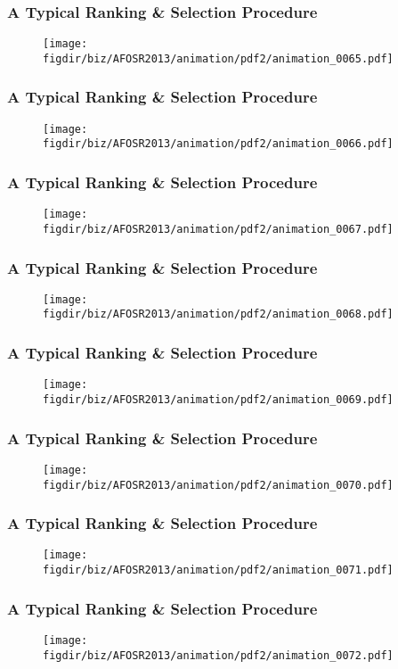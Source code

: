\documentclass[13pt]{beamer}
\newcommand{\figdir}{../../fig}
\begin{document}
\begin{frame}\frametitle{A Typical Ranking \& Selection Procedure}\begin{figure}\texttt{[image: \\figdir/biz/AFOSR2013/animation/pdf2/animation\_0065.pdf]}\end{figure}\end{frame}
\begin{frame}\frametitle{A Typical Ranking \& Selection Procedure}\begin{figure}\texttt{[image: \\figdir/biz/AFOSR2013/animation/pdf2/animation\_0066.pdf]}\end{figure}\end{frame}
\begin{frame}\frametitle{A Typical Ranking \& Selection Procedure}\begin{figure}\texttt{[image: \\figdir/biz/AFOSR2013/animation/pdf2/animation\_0067.pdf]}\end{figure}\end{frame}
\begin{frame}\frametitle{A Typical Ranking \& Selection Procedure}\begin{figure}\texttt{[image: \\figdir/biz/AFOSR2013/animation/pdf2/animation\_0068.pdf]}\end{figure}\end{frame}
\begin{frame}\frametitle{A Typical Ranking \& Selection Procedure}\begin{figure}\texttt{[image: \\figdir/biz/AFOSR2013/animation/pdf2/animation\_0069.pdf]}\end{figure}\end{frame}
\begin{frame}\frametitle{A Typical Ranking \& Selection Procedure}\begin{figure}\texttt{[image: \\figdir/biz/AFOSR2013/animation/pdf2/animation\_0070.pdf]}\end{figure}\end{frame}
\begin{frame}\frametitle{A Typical Ranking \& Selection Procedure}\begin{figure}\texttt{[image: \\figdir/biz/AFOSR2013/animation/pdf2/animation\_0071.pdf]}\end{figure}\end{frame}
\begin{frame}\frametitle{A Typical Ranking \& Selection Procedure}\begin{figure}\texttt{[image: \\figdir/biz/AFOSR2013/animation/pdf2/animation\_0072.pdf]}\end{figure}\end{frame}
\end{document}
